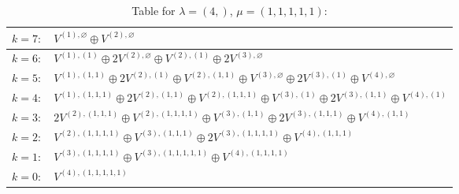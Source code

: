 \documentclass[a4paper,12pt]{article}
\begin{document}
\renewcommand{\arraystretch}{1.6} 
\begin{table}[H]
\centering
\caption{Table for $\lambda = (4,)$, $\mu = (1, 1, 1, 1, 1)$:}
\begin{tabular}{|>{\centering\arraybackslash}p{15cm}|}
\hline
 $k = 7: \quad V^{(1), \varnothing} \oplus V^{(2), \varnothing} $ \\ \hline
 $k = 6: \quad V^{(1), (1)} \oplus 2 V^{(2), \varnothing} \oplus V^{(2), (1)} \oplus 2 V^{(3), \varnothing} $ \\ \hline
 $k = 5: \quad V^{(1), (1, 1)} \oplus 2 V^{(2), (1)} \oplus V^{(2), (1, 1)} \oplus V^{(3), \varnothing} \oplus 2 V^{(3), (1)} \oplus V^{(4), \varnothing} $ \\ \hline
 $k = 4: \quad V^{(1), (1, 1, 1)} \oplus 2 V^{(2), (1, 1)} \oplus V^{(2), (1, 1, 1)} \oplus V^{(3), (1)} \oplus 2 V^{(3), (1, 1)} \oplus V^{(4), (1)} $ \\ \hline
 $k = 3: \quad 2 V^{(2), (1, 1, 1)} \oplus V^{(2), (1, 1, 1, 1)} \oplus V^{(3), (1, 1)} \oplus 2 V^{(3), (1, 1, 1)} \oplus V^{(4), (1, 1)} $ \\ \hline
 $k = 2: \quad V^{(2), (1, 1, 1, 1)} \oplus V^{(3), (1, 1, 1)} \oplus 2 V^{(3), (1, 1, 1, 1)} \oplus V^{(4), (1, 1, 1)} $ \\ \hline
 $k = 1: \quad V^{(3), (1, 1, 1, 1)} \oplus V^{(3), (1, 1, 1, 1, 1)} \oplus V^{(4), (1, 1, 1, 1)} $ \\ \hline
 $k = 0: \quad V^{(4), (1, 1, 1, 1, 1)} $ \\ \hline
\end{tabular}
\end{table}
\end{document}

